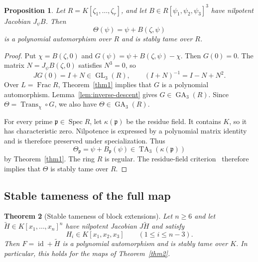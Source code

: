 \documentclass[11pt,reqno]{amsart}
\newtheorem{theorem}{Theorem}[section]
\newtheorem{proposition}[theorem]{Proposition}
\theoremstyle{definition}
\theoremstyle{remark}
\numberwithin{equation}{section}
\DeclareMathOperator{\GL}{GL}
\DeclareMathOperator{\GA}{GA}
\DeclareMathOperator{\TA}{TA}
\DeclareMathOperator{\Spec}{Spec}
\DeclareMathOperator{\Frac}{Frac}
\DeclareMathOperator{\id}{id}
\newcommand{\trans}[1]{\operatorname{Trans}_{#1}}
\begin{document}
\begin{proposition}\label{prop:ring-nilpotent}
Let $R=K[\zeta_1,\ldots,\zeta_r]$, and let $B\in R[\psi_1,\psi_2,\psi_3]^3$ have nilpotent Jacobian $J_\psi B$. Then
\[
 \Theta(\psi)=\psi+B(\zeta,\psi)
\]
is a polynomial automorphism over $R$ and is stably tame over $R$.
\end{proposition}

\begin{proof}
Put $\chi=B(\zeta,0)$ and $G(\psi)=\psi+B(\zeta,\psi)-\chi$. Then $G(0)=0$. The matrix $N=J_\psi B(\zeta,0)$ satisfies $N^3=0$, so
\[
 JG(0)=I+N\in\GL_3(R),\qquad (I+N)^{-1}=I-N+N^2.
\]
Over $L=\Frac R$, Theorem~\ref{thm1} implies that $G$ is a polynomial automorphism. Lemma~\ref{lem:inverse-descent} gives $G\in\GA_3(R)$. Since $\Theta=\trans{\chi}\circ G$, we also have $\Theta\in\GA_3(R)$.

For every prime $\mathfrak p\in\Spec R$, let $\kappa(\mathfrak p)$ be the residue field. It contains $K$, so it has characteristic zero. Nilpotence is expressed by a polynomial matrix identity and is therefore preserved under specialization. Thus
\[
 \Theta_{\mathfrak p}=\psi+B_{\mathfrak p}(\psi)
 \in\TA_3(\kappa(\mathfrak p))
\]
by Theorem~\ref{thm1}. The ring $R$ is regular. The residue-field criterion~\cite[Theorem~4.12]{BEW} therefore implies that $\Theta$ is stably tame over $R$.
\end{proof}

\subsection{Stable tameness of the full map}
\begin{theorem}[Stable tameness of block extensions]\label{thm3}
Let $n\geq6$ and let $\widetilde H\in K[x_1,\ldots,x_n]^n$ have nilpotent Jacobian $J\widetilde H$ and satisfy
\[
 H_i\in K[x_1,x_2,x_3]\qquad(1\leq i\leq n-3).
\]
Then $F=\id+\widetilde H$ is a polynomial automorphism and is stably tame over $K$. In particular, this holds for the maps of Theorem~\ref{thm2}.
\end{theorem}
\end{document}
